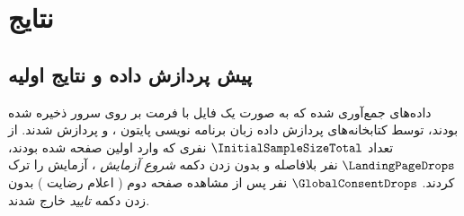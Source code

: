 \chapter{نتایج}
\label{chap:results}

\section{پیش پردازش داده و نتایج اولیه}
داده‌های جمع‌آوری شده که به صورت یک فایل با فرمت
بر روی سرور ذخیره شده بودند، توسط کتابخانه‌های پردازش داده زبان برنامه نویسی پایتون
\!،
و
پردازش شدند. از تعداد $\InitialSampleSizeTotal$
نفری که وارد اولین صفحه شده بودند،
$\LandingPageDrops$
نفر بلافاصله و بدون زدن دکمه
\textit{شروع آزمایش}
\!،
آزمایش را ترک کردند.
$\GlobalConsentDrops$
نفر پس از مشاهده صفحه دوم
\!(
اعلام رضایت
)
بدون زدن دکمه
\textit{تایید}
خارج شدند.


